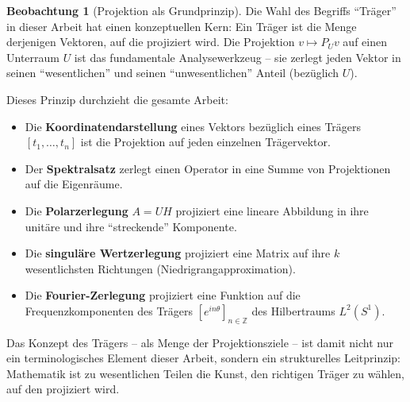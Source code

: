 ﻿\documentclass[a4paper,12pt]{report}
\theoremstyle{definition}
\newtheorem{beobachtung}{Beobachtung}
\begin{document}
\begin{beobachtung}[Projektion als Grundprinzip]
    Die Wahl des Begriffs ``Träger'' in dieser Arbeit
    hat einen konzeptuellen Kern: Ein Träger ist die Menge derjenigen
    Vektoren, auf die projiziert wird. Die Projektion
    $v \mapsto P_U v$ auf einen Unterraum $U$ ist das fundamentale
    Analysewerkzeug -- sie zerlegt jeden Vektor in seinen
    ``wesentlichen'' und seinen ``unwesentlichen'' Anteil
    (bezüglich $U$).

    Dieses Prinzip durchzieht die gesamte Arbeit:
    \begin{itemize}
        \item[-] Die \textbf{Koordinatendarstellung} eines Vektors
              bezüglich eines Trägers $[t_1, \ldots, t_n]$ ist die
              Projektion auf jeden einzelnen Trägervektor.
        \item[-] Der \textbf{Spektralsatz} zerlegt einen Operator
              in eine Summe von Projektionen auf die Eigenräume.
        \item[-] Die \textbf{Polarzerlegung} $A = UH$ projiziert
              eine lineare Abbildung in ihre unitäre und ihre
              ``streckende'' Komponente.
        \item[-] Die \textbf{singuläre Wertzerlegung} projiziert
              eine Matrix auf ihre $k$ wesentlichsten
              Richtungen (Niedrigrangapproximation).
        \item[-] Die \textbf{Fourier-Zerlegung} projiziert eine
              Funktion auf die Frequenzkomponenten des Trägers
              $[e^{in\theta}]_{n \in \mathbb{Z}}$ des Hilbertraums
              $L^2(S^1)$.
    \end{itemize}
    Das Konzept des Trägers -- als Menge der Projektionsziele --
    ist damit nicht nur ein terminologisches Element dieser Arbeit,
    sondern ein strukturelles Leitprinzip: Mathematik ist zu
    wesentlichen Teilen die Kunst, den richtigen Träger zu wählen,
    auf den projiziert wird.
\end{beobachtung}
\end{document}
